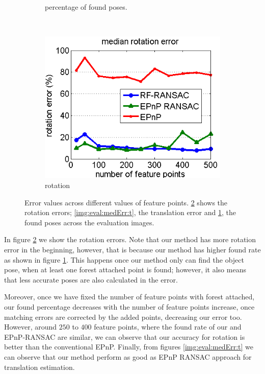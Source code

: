 \documentclass[annual]{acmsiggraph}
\begin{document}
\begin{figure}[h]
\begin{subfigure}[c]{0.48\columnwidth}
	\caption{percentage of found poses.}
	\label{img:eval:medErr:foundRate}
\end{subfigure}\\%
\begin{subfigure}[c]{0.55\columnwidth} 
	\includegraphics[width=\textwidth]{images/fixed_tau20_rfff20_quat.png} 
	\caption{rotation}
	\label{img:eval:medErr:quat}
\end{subfigure}%
\caption{Error values across different values of feature points. \ref{img:eval:medErr:quat} shows the rotation errors; \ref{img:eval:medErr:t}, the translation error and \ref{img:eval:medErr:foundRate}, the found poses across the evaluation images. }
\label{img:eval:medErr}
\end{figure}
 
In figure \ref{img:eval:medErr:quat} we show the rotation errors. Note that our method has more rotation error in the beginning, however, that is because our method has higher found rate as shown in figure \ref{img:eval:medErr:foundRate}. This happens once our method only can find the object pose, when at least one forest attached point is found; however, it also means that less accurate poses are also calculated in the error. 


Moreover, once we have fixed the number of feature points with forest attached, our found percentage decreases with the number of feature points increase, once matching errors are corrected by the added points, decreasing our error too. However, around $250$ to $400$ feature points, where the found rate of our and EPnP-RANSAC are similar, we can observe that our accuracy for rotation is better than the conventional EPnP. Finally, from figures \ref{img:eval:medErr:t} we can observe that our method perform as good as EPnP RANSAC approach for translation estimation. 
\end{document}

